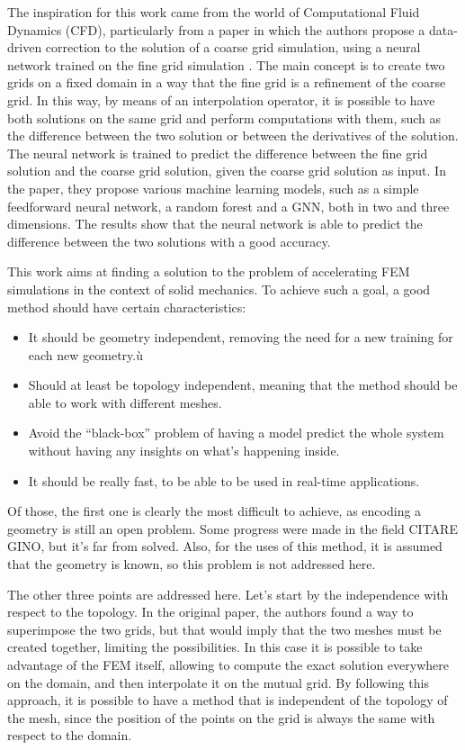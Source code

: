 The inspiration for this work came from the world of Computational Fluid Dynamics (CFD), particularly from a paper in which the authors propose a data-driven correction to the solution of a coarse grid simulation, using a neural network trained on the fine grid simulation \cite{kienerDatadrivenCorrectionCoarse2023}. The main concept is to create two grids on a fixed domain in a way that the fine grid is a refinement of the coarse grid. In this way, by means of an interpolation operator, it is possible to have both solutions on the same grid and perform computations with them, such as the difference between the two solution or between the derivatives of the solution. The neural network is trained to predict the difference between the fine grid solution and the coarse grid solution, given the coarse grid solution as input. In the paper, they propose various machine learning models, such as a simple feedforward neural network, a random forest and a GNN, both in two and three dimensions. The results show that the neural network is able to predict the difference between the two solutions with a good accuracy. 

This work aims at finding a solution to the problem of accelerating FEM simulations in the context of solid mechanics. To achieve such a goal, a good method should have certain characteristics: \begin{itemize}
    \item It should be geometry independent, removing the need for a new training for each new geometry.ù
    \item Should at least be topology independent, meaning that the method should be able to work with different meshes.
    \item Avoid the ``black-box'' problem of having a model predict the whole system without having any insights on what's happening inside.
    \item It should be really fast, to be able to be used in real-time applications.
\end{itemize}
Of those, the first one is clearly the most difficult to achieve, as encoding a geometry is still an open problem. Some progress were made in the field CITARE GINO, but it's far from solved. Also, for the uses of this method, it is assumed that the geometry is known, so this problem is not addressed here. 

The other three points are addressed here. Let's start by the independence with respect to the topology. In the original paper, the authors found a way to superimpose the two grids, but that would imply that the two meshes must be created together, limiting the possibilities. In this case it is possible to take advantage of the FEM itself, allowing to compute the exact solution everywhere on the domain, and then interpolate it on the mutual grid. By following this approach, it is possible to have a method that is independent of the topology of the mesh, since the position of the points on the grid is always the same with respect to the domain.

